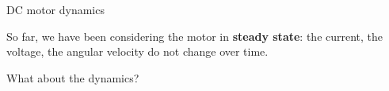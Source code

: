 \documentclass[compress]{beamer}
\begin{document}
\begin{frame}{DC motor dynamics}

    \Large
    So far, we have been considering the motor in \textbf{steady state}: the
    current, the voltage, the angular velocity do not change over time.

    \hspace{2em}

    What about the dynamics?


\end{frame}
\end{document}
